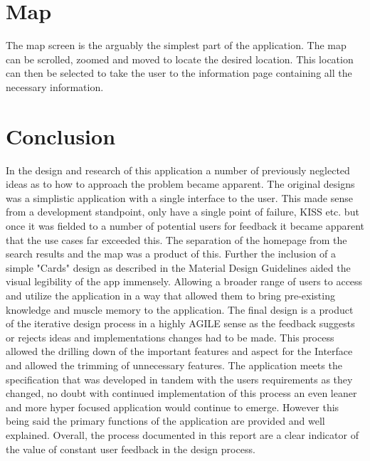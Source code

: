 \documentclass{article}
\begin{document}
\section{Map}
The map screen is the arguably the simplest part of the application.
The map can be scrolled, zoomed and moved to locate the desired location.
This location can then be selected to take the user to the information page containing all the necessary information.
\section{Conclusion}
In the design and research of this application a number of previously neglected ideas as to how to approach the problem became apparent.
The original designs was a simplistic application with a single interface to the user.
This made sense from a development standpoint, only have a single point of failure, KISS etc. but once it was fielded to a number of potential users for feedback it became apparent that the use cases far exceeded this.
The separation of the homepage from the search results and the map was a product of this.
Further the inclusion of a simple "Cards" design as described in the Material Design Guidelines aided the visual legibility of the app immensely.
Allowing a broader range of users to access and utilize the application in a way that allowed them to bring pre-existing knowledge and muscle memory to the application.
\linebreak
The final design is a product of the iterative design process in a highly AGILE sense as the feedback suggests or rejects ideas and implementations changes had to be made.
This process allowed the drilling down of the important features and aspect for the Interface and allowed the trimming of unnecessary features.
The application meets the specification that was developed in tandem with the users requirements as they changed, no doubt with continued implementation of this process an even leaner and more hyper focused application would continue to emerge.
However this being said the primary functions of the application are provided and well explained.
Overall, the process documented in this report are a clear indicator of the value of constant user feedback in the design process.
\end{document}
